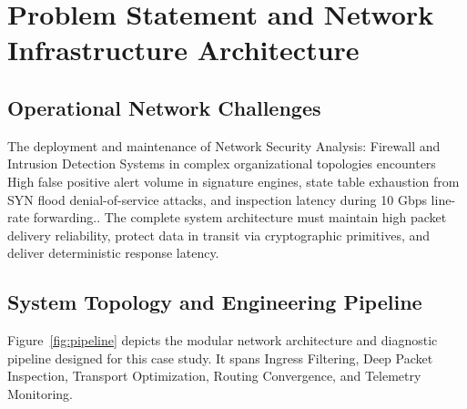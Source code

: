 \section{Problem Statement and Network Infrastructure Architecture}

\subsection{Operational Network Challenges}
The deployment and maintenance of Network Security Analysis: Firewall and Intrusion Detection Systems in complex organizational topologies encounters High false positive alert volume in signature engines, state table exhaustion from SYN flood denial-of-service attacks, and inspection latency during 10 Gbps line-rate forwarding.. The complete system architecture must maintain high packet delivery reliability, protect data in transit via cryptographic primitives, and deliver deterministic response latency.

\subsection{System Topology and Engineering Pipeline}
Figure~\ref{fig:pipeline} depicts the modular network architecture and diagnostic pipeline designed for this case study. It spans Ingress Filtering, Deep Packet Inspection, Transport Optimization, Routing Convergence, and Telemetry Monitoring.

